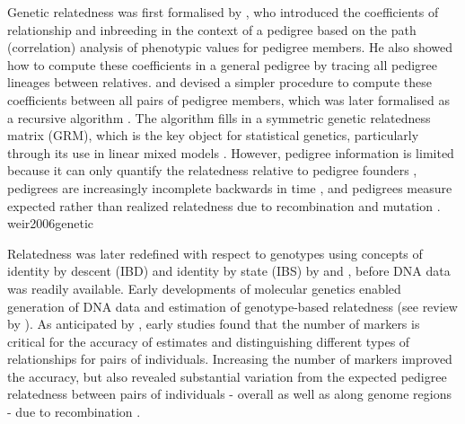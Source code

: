 \begin{tcolorbox}[breakable,pad at break*=1mm, colback=blue!5!white,colframe=blue!75!black,title=Box 1: A Brief History of Genetic Relatedness]


Genetic relatedness was first formalised by \cite{wright1922coefficients},
who introduced the coefficients of relationship and inbreeding in the
context of a pedigree based on the path (correlation) analysis of phenotypic
values for pedigree members.
%
He also showed how to compute these coefficients in a general pedigree by
tracing all pedigree lineages between relatives.
%
\cite{emik1949systematic} and \cite{cruden1949computation} devised a
simpler procedure to compute these coefficients between all pairs of
pedigree members, which was later formalised as a recursive algorithm
\citep{henderson1976simple}.
%
The algorithm fills in a symmetric genetic relatedness matrix (GRM), which is
the key object for statistical genetics, particularly through its use in
linear mixed models
\citep{falconer1996introduction, henderson1984applications,
lynch1998genetics, mrode2023linear}.
%
However, pedigree information is limited because
it can only quantify the relatedness relative to pedigree founders
\citep{wright1965interpretation, jacquard1975inbreeding},
pedigrees are increasingly incomplete backwards in time \citep[e.g.][]{legarra2015ancestral}, and
pedigrees measure expected rather than realized relatedness due to
recombination and mutation
\citep[e.g.][]{hill2011variation, thompson2013identity, garciacortes2013variance}.
weir2006genetic

Relatedness was later redefined with respect to genotypes using
concepts of identity by descent (IBD) and identity by state (IBS) by
\cite{cotterman1940calculus} and \cite{malecot1948mathematiques, malecot1969mathemathics},
before DNA data was readily available.
%
Early developments of molecular genetics enabled generation of DNA data
and estimation of genotype-based relatedness
(see review by \citet{weir2006genetic}).
%
As anticipated by \cite{thompson1975estimation}, early studies found that
the number of markers is critical for the accuracy of estimates
and distinguishing different types of relationships for pairs of individuals.
%
Increasing the number of markers improved the accuracy, but also
revealed substantial variation from the expected pedigree relatedness
between pairs of individuals - overall as well as along genome regions -
due to recombination \citep{weir2006genetic}.


\end{tcolorbox}
